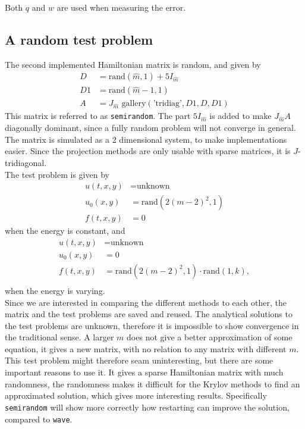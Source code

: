 \noindent Both $q$ and $w$ are used when measuring the error. \\

\subsection{A random test problem} %
The second implemented Hamiltonian matrix is random, and given by
\begin{equation*}
\begin{aligned}
D &= \text{rand}(\hat{m},1) + 5 I_{\hat{m}} \\
D1 & = \text{rand}(\hat{m}-1,1) \\
A &= J_{\hat{m}} \text{ gallery}(\text{'tridiag'},D1,D,D1)
\end{aligned}
\end{equation*}
This matrix is referred to as \texttt{semirandom}. The part $5 I_{\hat{m}} $ is added to make $J_{\hat{m}}A$ diagonally dominant, since a fully random problem will not converge in general. The matrix is simulated as a 2 dimensional system, to make implementations easier. Since the projection methods are only usable with sparse matrices, it is $J$-tridiagonal.\\

\noindent The test problem is given by
\begin{equation*}
\begin{aligned}
u(t,x,y) &= \text{unknown} \\
u_0(x,y) &= \text{rand} (2 (m-2)^2,1) \\
f(t,x,y) &= 0
\end{aligned}
\end{equation*}
when the energy is constant, and 
\begin{equation*}
\begin{aligned}
u(t,x,y) &= \text{unknown} \\
u_0(x,y) &= 0 \\
f(t,x,y) &= \text{rand} (2 (m-2)^2,1) \cdot \text{rand}(1,k), \\
\end{aligned}
\end{equation*}
when the energy is varying.\\

\noindent Since we are interested in comparing the different methods to each other, the matrix and the test problems are saved and reused.
The analytical solutions to the test problems are unknown, therefore it is impossible to show convergence in the traditional sense. A larger $m$ does not give a better approximation of some equation, it gives a new matrix, with no relation to any matrix with different $m$. This test problem might therefore seam uninteresting, but there are some important reasons to use it. It gives a sparse Hamiltonian matrix with much randomness, the randomness makes it difficult for the Krylov methods to find an approximated solution, which gives more interesting results. Specifically \texttt{semirandom} will show more correctly how restarting can improve the solution, compared to \texttt{wave}.  \\

